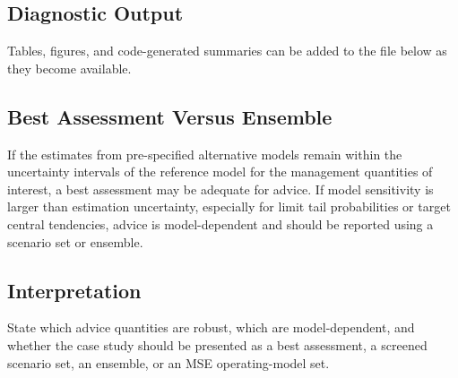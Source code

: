 

\subsection{Diagnostic Output}

Tables, figures, and code-generated summaries can be added to the file below as they
become available.



\subsection{Best Assessment Versus Ensemble}

If the estimates from pre-specified alternative models remain within the uncertainty
intervals of the reference model for the management quantities of interest, a best
assessment may be adequate for advice. If model sensitivity is larger than estimation
uncertainty, especially for limit tail probabilities or target central tendencies, advice is
model-dependent and should be reported using a scenario set or ensemble.



\subsection{Interpretation}

State which advice quantities are robust, which are model-dependent, and whether the
case study should be presented as a best assessment, a screened scenario set, an ensemble,
or an MSE operating-model set.


